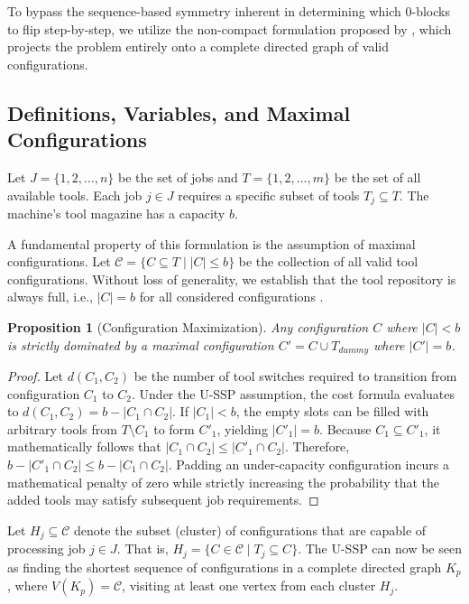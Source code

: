 \documentclass[12pt]{article}
\newtheorem{proposition}{Proposition}[section]
\begin{document}
	To bypass the sequence-based symmetry inherent in determining which 0-blocks to flip step-by-step, we utilize the non-compact formulation proposed by \citet{Colares2026}, which projects the problem entirely onto a complete directed graph of valid configurations.
	
	\subsection{Definitions, Variables, and Maximal Configurations}
	
	Let $J = \{1, 2, \dots, n\}$ be the set of jobs and $T = \{1, 2, \dots, m\}$ be the set of all available tools. Each job $j \in J$ requires a specific subset of tools $T_j \subseteq T$. The machine's tool magazine has a capacity $b$.
	
	A fundamental property of this formulation is the assumption of maximal configurations. Let $\mathcal{C} = \{C \subseteq T \mid |C| \le b\}$ be the collection of all valid tool configurations. Without loss of generality, we establish that the tool repository is always full, i.e., $|C| = b$ for all considered configurations \citep{Colares2026}.
	
	\begin{proposition}[Configuration Maximization]
		Any configuration $C$ where $|C| < b$ is strictly dominated by a maximal configuration $C' = C \cup T_{dummy}$ where $|C'| = b$.
	\end{proposition}
	\begin{proof}
		Let $d(C_1, C_2)$ be the number of tool switches required to transition from configuration $C_1$ to $C_2$. Under the U-SSP assumption, the cost formula evaluates to $d(C_1, C_2) = b - |C_1 \cap C_2|$. If $|C_1| < b$, the empty slots can be filled with arbitrary tools from $T \setminus C_1$ to form $C'_1$, yielding $|C'_1| = b$. Because $C_1 \subseteq C'_1$, it mathematically follows that $|C_1 \cap C_2| \le |C'_1 \cap C_2|$. Therefore, $b - |C'_1 \cap C_2| \le b - |C_1 \cap C_2|$. Padding an under-capacity configuration incurs a mathematical penalty of zero while strictly increasing the probability that the added tools may satisfy subsequent job requirements.
	\end{proof}
	
	Let $H_j \subseteq \mathcal{C}$ denote the subset (cluster) of configurations that are capable of processing job $j \in J$. That is, $H_j = \{C \in \mathcal{C} \mid T_j \subseteq C\}$. The U-SSP can now be seen as finding the shortest sequence of configurations in a complete directed graph $K_p$, where $V(K_p) = \mathcal{C}$, visiting at least one vertex from each cluster $H_j$.
	
\end{document}

